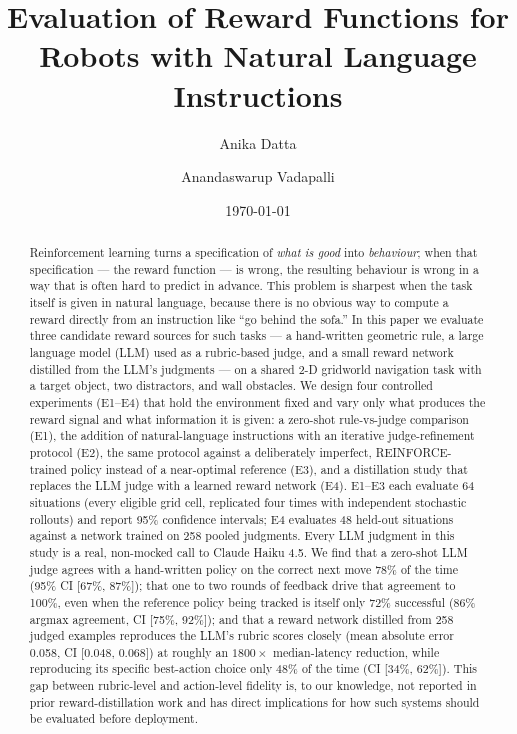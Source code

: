 \documentclass[10pt,twocolumn]{article}
\title{Evaluation of Reward Functions for Robots with Natural Language Instructions}
\author[1]{Anika Datta}
\author[2]{Anandaswarup Vadapalli}
\affil[1]{Independent Researcher}
\affil[2]{Research Spark Hub Inc.}
\date{\today}
\begin{document}
\maketitle

\begin{abstract}
Reinforcement learning turns a specification of \emph{what is good} into
\emph{behaviour}; when that specification --- the reward function --- is
wrong, the resulting behaviour is wrong in a way that is often hard to
predict in advance. This problem is sharpest when the task itself is
given in natural language, because there is no obvious way to compute a
reward directly from an instruction like ``go behind the sofa.'' In this
paper we evaluate three candidate reward sources for such tasks --- a
hand-written geometric rule, a large language model (LLM) used as a
rubric-based judge, and a small reward network distilled from the LLM's
judgments --- on a shared 2-D gridworld navigation task with a target
object, two distractors, and wall obstacles. We design four controlled
experiments (E1--E4) that hold the environment fixed and vary only what
produces the reward signal and what information it is given: a
zero-shot rule-vs-judge comparison (E1), the addition of natural-language
instructions with an iterative judge-refinement protocol (E2), the same
protocol against a deliberately imperfect, REINFORCE-trained policy
instead of a near-optimal reference (E3), and a distillation study that
replaces the LLM judge with a learned reward network (E4). E1--E3 each
evaluate 64 situations (every eligible grid cell, replicated four times
with independent stochastic rollouts) and report 95\% confidence
intervals; E4 evaluates 48 held-out situations against a network trained
on 258 pooled judgments. Every LLM judgment in this study is a real,
non-mocked call to Claude Haiku 4.5. We find that a zero-shot LLM judge
agrees with a hand-written policy on the correct next move 78\% of the
time (95\% CI [67\%, 87\%]); that one to two rounds of feedback drive
that agreement to 100\%, even when the reference policy being tracked is
itself only 72\% successful (86\% argmax agreement, CI [75\%, 92\%]);
and that a reward network distilled from 258 judged examples reproduces
the LLM's rubric scores closely (mean absolute error 0.058, CI [0.048,
0.068]) at roughly an $1800\times$ median-latency reduction, while
reproducing its specific best-action choice only 48\% of the time (CI
[34\%, 62\%]). This gap between rubric-level and action-level fidelity
is, to our knowledge, not reported in prior reward-distillation work and
has direct implications for how such systems should be evaluated before
deployment.
\end{abstract}
\end{document}
